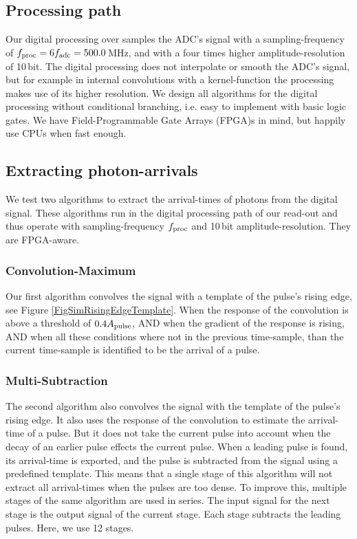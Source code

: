\documentclass{article}%
\begin{document}
\begin{multicols}{2}
\subsection*{Processing path}%
%
Our digital processing over samples the ADC's signal with a sampling-frequency of $f_\text{proc}{} = 6f_\text{adc}{} = 500.0$\,MHz, and with a four times higher amplitude-resolution of 10\,bit.
%
The digital processing does not interpolate or smooth the ADC's signal, but for example in internal convolutions with a kernel-function the processing makes use of its higher resolution.
%
We design all algorithms for the digital processing without conditional branching, i.e. easy to implement with basic logic gates.
%
We have Field-Programmable Gate Arrays (FPGA)s in mind, but happily use CPUs when fast enough.
%
\subsection*{Extracting photon-arrivals}%
%
We test two algorithms to extract the arrival-times of photons from the digital signal.
%
These algorithms run in the digital processing path of our read-out and thus operate with sampling-frequency $f_\text{proc}{}$ and 10\,bit amplitude-resolution.
%
They are FPGA-aware.
%
\subsubsection*{Convolution-Maximum}%
%
Our first algorithm convolves the signal with a template of the pulse's rising edge, see Figure \ref{FigSimRisingEdgeTemplate}.
%
When the response of the convolution is above a threshold of $0.4A_\text{pulse}{}$, AND when the gradient of the response is rising, AND when all these conditions where not in the previous time-sample, than the current time-sample is identified to be the arrival of a pulse.
%
\subsubsection*{Multi-Subtraction}%
%
The second algorithm also convolves the signal with the template of the pulse's rising edge. It also uses the response of the convolution to estimate the arrival-time of a pulse.
%
But it does not take the current pulse into account when the decay of an earlier pulse effects the current pulse.
%
When a leading pulse is found, its arrival-time is exported, and the pulse is subtracted from the signal using a predefined template.
%
This means that a single stage of this algorithm will not extract all arrival-times when the pulses are too dense.
%
To improve this, multiple stages of the same algorithm are used in series.
%
The input signal for the next stage is the output signal of the current stage.
%
Each stage subtracts the leading pulses.
%
Here, we use 12 stages.
%

\end{multicols}
\end{document}
